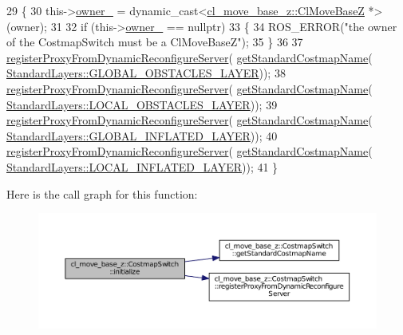 \begin{DoxyCode}
29 \{
30     this->\hyperlink{classcl__move__base__z_1_1CostmapSwitch_a42a7da3f7301daa691ef1593ae926618}{owner\_} = \textcolor{keyword}{dynamic\_cast<}\hyperlink{classcl__move__base__z_1_1ClMoveBaseZ}{cl\_move\_base\_z::ClMoveBaseZ} *\textcolor{keyword}{>}(owner);
31 
32     \textcolor{keywordflow}{if} (this->\hyperlink{classcl__move__base__z_1_1CostmapSwitch_a42a7da3f7301daa691ef1593ae926618}{owner\_} == \textcolor{keyword}{nullptr})
33     \{
34         ROS\_ERROR(\textcolor{stringliteral}{"the owner of the CostmapSwitch must be a ClMoveBaseZ"});
35     \}
36 
37     \hyperlink{classcl__move__base__z_1_1CostmapSwitch_a0d04ca7b655f850ba3107393f1c437cb}{registerProxyFromDynamicReconfigureServer}(
      \hyperlink{classcl__move__base__z_1_1CostmapSwitch_ac46796874242fdaa7efef86b66a55102}{getStandardCostmapName}(
      \hyperlink{classcl__move__base__z_1_1CostmapSwitch_af38aeee5e3893e689cd74ddddfe0df15a94404229e09ab748aab0096bd5ff3656}{StandardLayers::GLOBAL\_OBSTACLES\_LAYER}));
38     \hyperlink{classcl__move__base__z_1_1CostmapSwitch_a0d04ca7b655f850ba3107393f1c437cb}{registerProxyFromDynamicReconfigureServer}(
      \hyperlink{classcl__move__base__z_1_1CostmapSwitch_ac46796874242fdaa7efef86b66a55102}{getStandardCostmapName}(
      \hyperlink{classcl__move__base__z_1_1CostmapSwitch_af38aeee5e3893e689cd74ddddfe0df15aff8d30cf6ceac8551691e28c328aebe6}{StandardLayers::LOCAL\_OBSTACLES\_LAYER}));
39     \hyperlink{classcl__move__base__z_1_1CostmapSwitch_a0d04ca7b655f850ba3107393f1c437cb}{registerProxyFromDynamicReconfigureServer}(
      \hyperlink{classcl__move__base__z_1_1CostmapSwitch_ac46796874242fdaa7efef86b66a55102}{getStandardCostmapName}(
      \hyperlink{classcl__move__base__z_1_1CostmapSwitch_af38aeee5e3893e689cd74ddddfe0df15a1757575ee674622adfb325de182a65d6}{StandardLayers::GLOBAL\_INFLATED\_LAYER}));
40     \hyperlink{classcl__move__base__z_1_1CostmapSwitch_a0d04ca7b655f850ba3107393f1c437cb}{registerProxyFromDynamicReconfigureServer}(
      \hyperlink{classcl__move__base__z_1_1CostmapSwitch_ac46796874242fdaa7efef86b66a55102}{getStandardCostmapName}(
      \hyperlink{classcl__move__base__z_1_1CostmapSwitch_af38aeee5e3893e689cd74ddddfe0df15aab9e94e9dc4c62e74e48ee34b11c8807}{StandardLayers::LOCAL\_INFLATED\_LAYER}));
41 \}
\end{DoxyCode}


Here is the call graph for this function\+:
\nopagebreak
\begin{figure}[H]
\begin{center}
\leavevmode
\includegraphics[width=350pt]{classcl__move__base__z_1_1CostmapSwitch_af629ac6f390f90c0b6ad1008fa6b2586_cgraph}
\end{center}
\end{figure}


